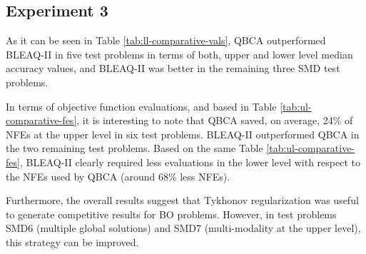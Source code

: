 \documentclass[conference]{IEEEtran}
\theoremstyle{definition}
\begin{document}
\subsection{Experiment 3}
As it can be seen in Table \ref{tab:ll-comparative-vals}, QBCA outperformed BLEAQ-II
in five test problems in terms of both, upper and lower level median accuracy
values, and BLEAQ-II was better in the remaining three SMD test problems. 

In terms of objective function evaluations, and based in Table \ref{tab:ul-comparative-fes},
it is interesting to note that QBCA saved, on average, 24\% of NFEs at the upper
level in six test problems. BLEAQ-II outperformed QBCA in the two remaining test
problems. Based on the same Table \ref{tab:ul-comparative-fes}, BLEAQ-II clearly
required less evaluations in the lower level with respect to the NFEs used by
QBCA (around 68\% less NFEs). 

Furthermore, the overall results suggest that Tykhonov regularization was useful
to generate competitive results for BO problems. However, in test problems SMD6
(multiple global solutions) and SMD7 (multi-modality at the upper level), this
strategy can be improved.
\end{document}
